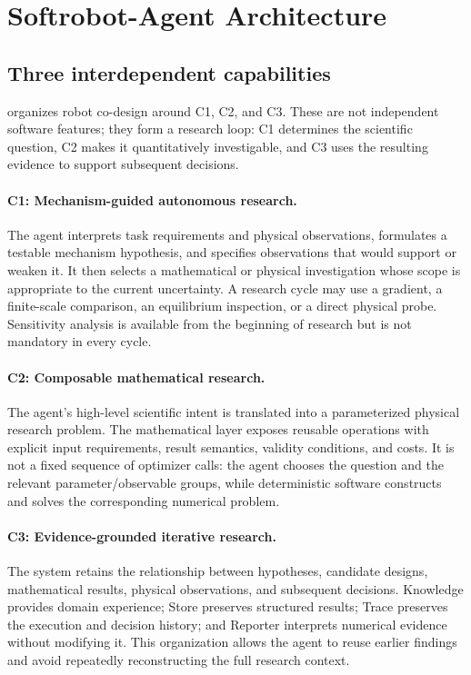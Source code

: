 \section{Softrobot-Agent Architecture}
\label{sec:architecture}

\subsection{Three interdependent capabilities}

\softrobotagent{} organizes robot co-design around C1, C2, and C3. These are not independent software features; they form a research loop: C1 determines the scientific question, C2 makes it quantitatively investigable, and C3 uses the resulting evidence to support subsequent decisions.

\paragraph{C1: Mechanism-guided autonomous research.}
The agent interprets task requirements and physical observations, formulates a testable mechanism hypothesis, and specifies observations that would support or weaken it. It then selects a mathematical or physical investigation whose scope is appropriate to the current uncertainty. A research cycle may use a gradient, a finite-scale comparison, an equilibrium inspection, or a direct physical probe. Sensitivity analysis is available from the beginning of research but is not mandatory in every cycle.

\paragraph{C2: Composable mathematical research.}
The agent's high-level scientific intent is translated into a parameterized physical research problem. The mathematical layer exposes reusable operations with explicit input requirements, result semantics, validity conditions, and costs. It is not a fixed sequence of optimizer calls: the agent chooses the question and the relevant parameter/observable groups, while deterministic software constructs and solves the corresponding numerical problem.

\paragraph{C3: Evidence-grounded iterative research.}
The system retains the relationship between hypotheses, candidate designs, mathematical results, physical observations, and subsequent decisions. Knowledge provides domain experience; Store preserves structured results; Trace preserves the execution and decision history; and Reporter interprets numerical evidence without modifying it. This organization allows the agent to reuse earlier findings and avoid repeatedly reconstructing the full research context.

